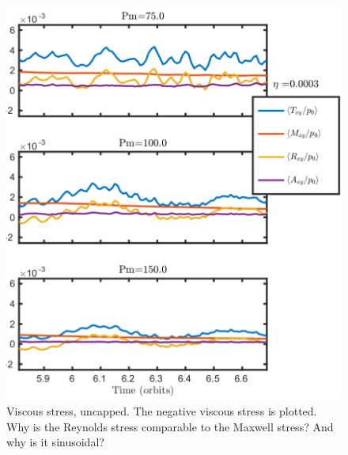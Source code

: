 \begin{figure}[h]
  \begin{center}  
    \includegraphics[width=.9\textwidth, angle=0.]{img/pLimiter-eta3-Pm11-13_StressesZoom_reversed.pdf}
  \end{center}
  \caption{Viscous stress, uncapped. The negative viscous stress is plotted. Why is the Reynolds stress comparable to the Maxwell stress? And why is it sinusoidal?}
  \label{fig:visc}
\end{figure}
